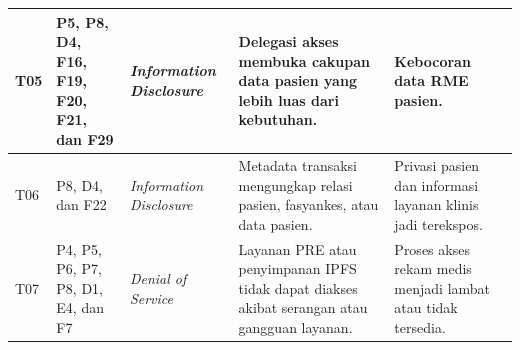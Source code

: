 \documentclass[bahasa, 12pt, a4paper, onecolumn, oneside, final]{report}
\begin{document}
{\begin{longtable}{|p{0.65cm}|p{2.2cm}|p{1.9cm}|p{4cm}|p{4cm}|}
		T05                                                                                                                                                                         &
		P5, P8, D4, F16, F19, F20, F21, dan F29                                                                                                                                     &
		\textit{Information Disclosure}                                                                                                                                             &
		Delegasi akses membuka cakupan data pasien yang lebih luas dari kebutuhan.                                                                                                  &
		Kebocoran data RME pasien.                                                                                                                                                                                                                                               \\
		\hline

		T06                                                                                                                                                                         &
		P8, D4, dan F22                                                                                                                                                             &
		\textit{Information Disclosure}                                                                                                                                             &
		Metadata transaksi mengungkap relasi pasien, fasyankes, atau data pasien.                                                                                                   &
		Privasi pasien dan informasi layanan klinis jadi terekspos.                                                                                                                                                                                                              \\
		\hline

		T07                                                                                                                                                                         &
		P4, P5, P6, P7, P8, D1, E4, dan F7                                                                                                                                          &
		\textit{Denial of Service}                                                                                                                                                  &
		Layanan PRE atau penyimpanan IPFS tidak dapat diakses akibat serangan atau gangguan layanan.                                                                                &
		Proses akses rekam medis menjadi lambat atau tidak tersedia.                                                                                                                                                                                                             \\
		\hline


\end{longtable}}
\end{document}
